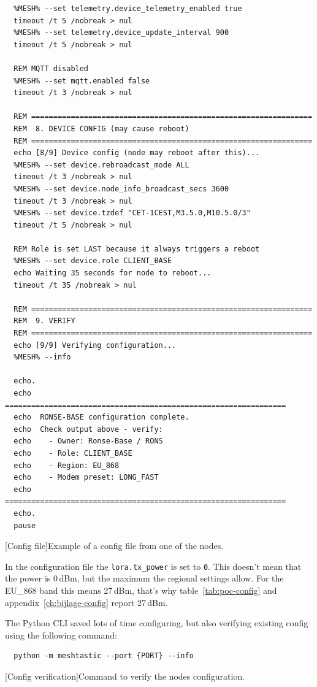 \begin{verbatim}
  %MESH% --set telemetry.device_telemetry_enabled true
  timeout /t 5 /nobreak > nul
  %MESH% --set telemetry.device_update_interval 900
  timeout /t 5 /nobreak > nul

  REM MQTT disabled
  %MESH% --set mqtt.enabled false
  timeout /t 3 /nobreak > nul

  REM ================================================================
  REM  8. DEVICE CONFIG (may cause reboot)
  REM ================================================================
  echo [8/9] Device config (node may reboot after this)...
  %MESH% --set device.rebroadcast_mode ALL
  timeout /t 3 /nobreak > nul
  %MESH% --set device.node_info_broadcast_secs 3600
  timeout /t 3 /nobreak > nul
  %MESH% --set device.tzdef "CET-1CEST,M3.5.0,M10.5.0/3"
  timeout /t 5 /nobreak > nul

  REM Role is set LAST because it always triggers a reboot
  %MESH% --set device.role CLIENT_BASE
  echo Waiting 35 seconds for node to reboot...
  timeout /t 35 /nobreak > nul

  REM ================================================================
  REM  9. VERIFY
  REM ================================================================
  echo [9/9] Verifying configuration...
  %MESH% --info

  echo.
  echo ================================================================
  echo  RONSE-BASE configuration complete.
  echo  Check output above - verify:
  echo    - Owner: Ronse-Base / RONS
  echo    - Role: CLIENT_BASE
  echo    - Region: EU_868
  echo    - Modem preset: LONG_FAST
  echo ================================================================
  echo.
  pause
\end{verbatim}
[Config file]{\label{lst:poc-config-file}Example of a config file from one of the nodes.}

In the configuration file the \texttt{lora.tx\_power} is set to \texttt{0}. This doesn't mean that the power is 0\,dBm, but the maximum the regional settings allow.
For the EU\_868 band this means 27\,dBm, that's why table~\ref{tab:poc-config} and appendix~\ref{ch:bijlage-config} report 27\,dBm.

The Python CLI saved lots of time configuring, but also verifying existing config using the following command:

\begin{verbatim}
  python -m meshtastic --port {PORT} --info
\end{verbatim}
[Config verification]{Command to verify the nodes configuration.}


